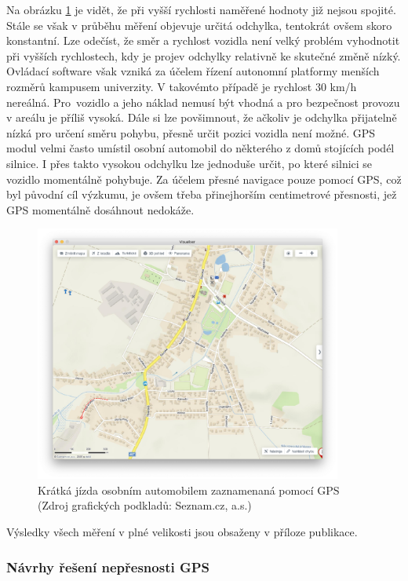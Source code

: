 \documentclass[czech, bachelor]{diploma}
\begin{document}
Na obrázku \ref{fig:olsinaautem} je vidět, že při vyšší rychlosti naměřené hodnoty již nejsou spojité. Stále se však v průběhu
měření objevuje určitá odchylka, tentokrát ovšem skoro konstantní. Lze odečíst, že směr a rychlost vozidla není velký problém
vyhodnotit při vyšších rychlostech, kdy je projev odchylky relativně ke skutečné změně nízký. Ovládací software však vzniká
za účelem řízení autonomní platformy menších rozměrů kampusem univerzity. V takovémto případě je rychlost 30 km/h nereálná.
Pro~vozidlo a jeho náklad nemusí být vhodná a pro bezpečnost provozu v areálu je příliš vysoká. Dále si lze povšimnout, že ačkoliv
je odchylka přijatelně nízká pro určení směru pohybu, přesně určit pozici vozidla není možné. GPS modul velmi často umístil osobní
automobil do některého z domů stojících podél silnice. I přes takto vysokou odchylku lze jednoduše určit, po které silnici se
vozidlo momentálně pohybuje. Za účelem přesné navigace pouze pomocí GPS, což byl původní cíl výzkumu, je ovšem třeba přinejhorším
centimetrové přesnosti, jež GPS momentálně dosáhnout nedokáže.

\begin{figure}
    \centering
    \includegraphics[width=0.9\textwidth]{Figures/olsinaautem.png}
    \caption{Krátká jízda osobním automobilem zaznamenaná pomocí GPS (Zdroj grafických podkladů: Seznam.cz, a.s.)}
    \label{fig:olsinaautem}
\end{figure}

Výsledky všech měření v plné velikosti jsou obsaženy v příloze publikace.

\subsubsection{Návrhy řešení nepřesnosti GPS}
\end{document}
